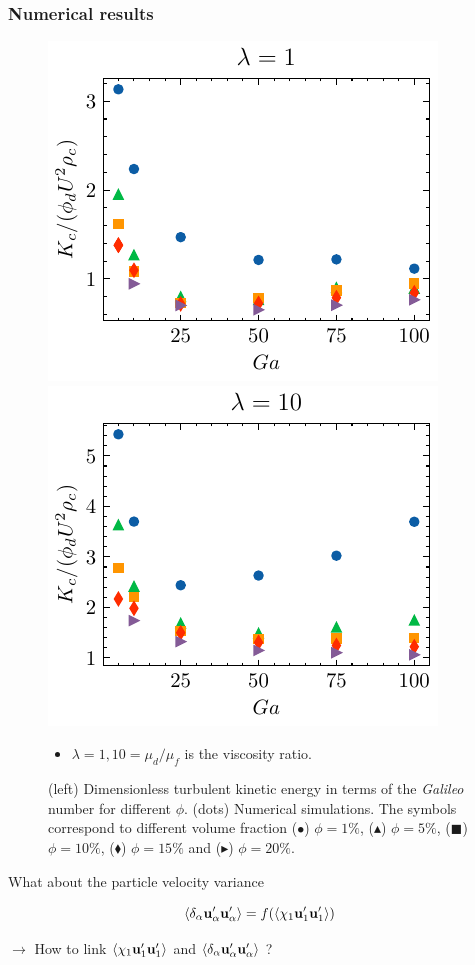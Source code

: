 \documentclass{sintefbeamer}
\begin{document}
\begin{frame}
  \frametitle{Numerical results}

  \begin{figure}[h!]
    \centering
    \includegraphics[height=0.3\textwidth]{image/HOMOGENEOUS/fCA/Tf_l_1.pdf}
    \includegraphics[height=0.3\textwidth]{image/HOMOGENEOUS/fCA/Tf_l_10.pdf}
    \caption{(left) Dimensionless turbulent kinetic energy in terms of the \textit{Galileo} number for different $\phi$. (dots) Numerical simulations.
    The symbols correspond to different volume fraction ($\bullet$) $\phi = 1\%$, ($\blacktriangle$) $\phi = 5\%$, ($\blacksquare$) $\phi = 10\%$, ($\blacklozenge$) $\phi = 15\%$ and ($\blacktriangleright$) $\phi = 20\%$.}
    \label{fig:Tf_Bf}

    \begin{itemize}
      \item $\lambda = 1,10 = \mu_d/\mu_f$ is the viscosity ratio. 
    \end{itemize}
\end{figure}

\end{frame}
\begin{frame}
  {What about the particle velocity variance }

  \begin{equation*}
    \left<\delta_\alpha \textbf{u}_\alpha'\textbf{u}_\alpha'\right>
    = f(\left<\chi_1 \textbf{u}_1'\textbf{u}_1'\right>)
\end{equation*}

\vfill

$\to$ How to link $ \left<\chi_1 \textbf{u}_1'\textbf{u}_1'\right>$ and $\left<\delta_\alpha \textbf{u}_\alpha' \textbf{u}_\alpha'\right>$ ?
\end{frame}
\end{document}
